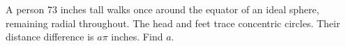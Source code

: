 A person 73 inches tall walks once around the equator of an ideal sphere, remaining radial throughout. The head and feet trace concentric circles. Their distance difference is $a\pi$ inches. Find $a$.

